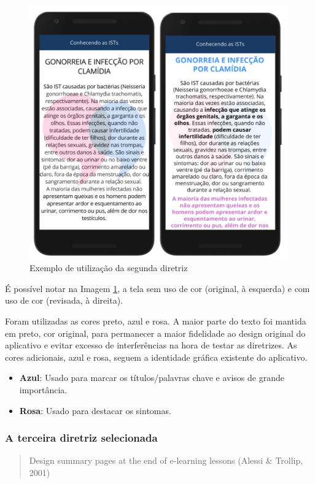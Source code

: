 \documentclass[12pt]{article}
\begin{document}
\begin{figure}[H]
  \centering
  \includegraphics[width=30em]{images/image_2.png}
  \caption{Exemplo de utilização da segunda diretriz}
  \label{fig:img2}
\end{figure}

É possível notar na Imagem \ref{fig:img2}, a tela sem uso de cor (original, à esquerda) e com uso de cor (revisada, à direita).

Foram utilizadas as cores preto, azul e rosa. A maior parte do texto foi mantida em preto, cor original, para permanecer a maior fidelidade ao design original do aplicativo e evitar excesso de interferências na hora de testar as diretrizes. As cores adicionais, azul e rosa, seguem a identidade gráfica existente do aplicativo.

\begin{itemize}
\item \textbf{Azul}: Usado para marcar os títulos/palavras chave e avisos de grande importância.
\item \textbf{Rosa}: Usado para destacar os sintomas.
\end{itemize}

\subsubsection{A terceira diretriz selecionada}

\begin{quote}
	Design summary pages at the end of e-learning lessons (Alessi \& Trollip, 2001)
\end{quote}
\end{document}
